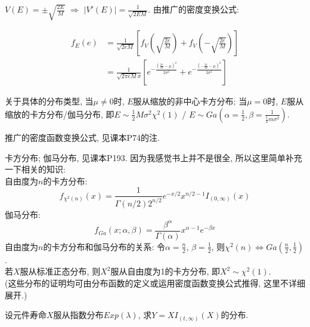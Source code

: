 \documentclass[standard]{ExBook}
\begin{document}
\begin{qitems}
\begin{bbox}
$V(E)=\pm\sqrt{\displaystyle\frac{2E}{M}}$ $\Longrightarrow$ $|V'(E)|=\displaystyle\frac{1}{\sqrt{2EM}}$. 由推广的密度变换公式:
\vspace{-2em}
\begin{center}
\begin{equation}
\begin{aligned}
    \nonumber
f_{E}(e)&=\displaystyle\frac{1}{\sqrt{2eM}}\left[f_{V}\left(\sqrt{\frac{2e}{M}}\right)+f_{V}\left(-\sqrt{\frac{2e}{M}}\right)\right]\\
 &=\displaystyle\frac{1}{\sqrt{2\pi eM}\sigma}\left[e^{-\displaystyle\frac{(\frac{2e}{M}-\mu)^2}{2 \sigma^2}}+e^{-\displaystyle\frac{(-\frac{2e}{M}-\mu)^2}{2 \sigma^2}}\right]
\end{aligned}
\end{equation}
\end{center}
关于具体的分布类型, 当$\mu\neq0$时, $E$服从缩放的非中心卡方分布; 当$\mu=0$时, $E$服从缩放的卡方分布/伽马分布, 即$E\sim\frac{1}{2}M \sigma^2 \chi^{2}(1)$ / $E\sim Ga(\alpha=\frac{1}{2},\beta=\frac{1}{\frac{1}{2}m \sigma^2})$.

\textcolor{themeColor}{\selectfont {} 推广的密度函数变换公式, 见课本P74的注.}

\textcolor{themeColor}{\selectfont {} 卡方分布; 伽马分布, 见课本P193. 因为我感觉书上并不是很全, 所以这里简单补充一下相关的知识:\\
自由度为$n$的卡方分布:
$$f_{\chi^{2}(n)}(x)=\displaystyle\frac{1}{\Gamma(n/2) 2^{n/2}}e^{-x/2}x^{n/2-1}I_{(0,\infty)}(x)$$
伽马分布:
$$f_{Ga}(x;\alpha,\beta)=\frac{\beta^{\alpha}}{\Gamma(\alpha)}x^{\alpha-1}e^{-\beta x}$$
自由度为$n$的卡方分布和伽马分布的关系: 令$\alpha=\frac{n}{2}$, $\beta=\frac{1}{2}$, 则$\chi^{2}(n)\Longleftrightarrow Ga(\frac{n}{2},\frac{1}{2})$.\\
若$X$服从标准正态分布, 则$X^{2}$服从自由度为1的卡方分布, 即$X^{2}\sim\chi^{2}(1)$.\\
(这些分布的证明均可由分布函数的定义或运用密度函数变换公式推得, 这里不详细展开.)}
    \end{bbox}

\vspace{-5em}

    \begin{bbox}
    \begin{shaded}
        \qitem
设元件寿命$X$服从指数分布$Exp(\lambda)$, 求$Y=XI_{(t,\infty)}(X)$的分布.
    \end{shaded}
    \end{bbox}


\end{qitems}
\end{document}
